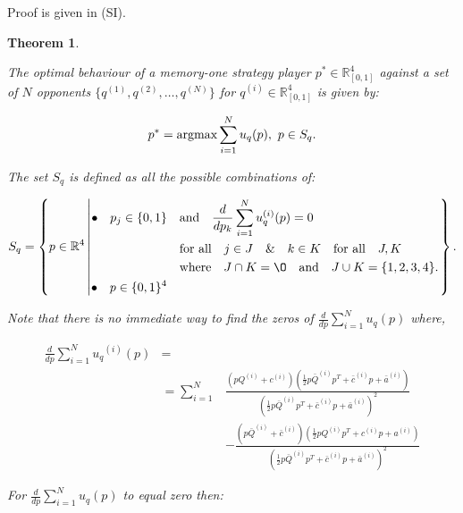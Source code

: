 \documentclass[9pt,twocolumn,twoside,lineno]{pnas-new}
\newcommand{\R}{\mathbb{R}}
\newtheorem{theorem}{Theorem}
\begin{document}
Proof is given in (SI).

\begin{theorem}\label{memone_group_best_response}

The optimal behaviour of a memory-one strategy player
\(p^* \in \R_{[0, 1]} ^ 4\)
against a set of \(N\) opponents \(\{q^{(1)}, q^{(2)}, \dots, q^{(N)} \}\)
for \(q^{(i)} \in \R_{[0, 1]} ^ 4\) is given by:

\[p^* = \textnormal{argmax}\sum\limits_{i=1} ^ N  u_q(p), \ p \in S_q.\]

The set \(S_q\) is defined as all the possible combinations of:

{\tiny
\begin{equation}\label{eq:s_q_set}
    S_q =
    \left\{p \in \mathbb{R} ^ 4 \left|
        \begin{aligned}
            \bullet\quad p_j \in \{0, 1\} & \quad \text{and} \quad \frac{d}{dp_k} 
            \sum\limits_{i=1} ^ N  u_q^{(i)}(p) = 0 \\
            & \quad \text{for all} \quad j \in J \quad \&  \quad k \in K  \quad \text{for all} \quad J, K \\
            & \quad \text{where} \quad J \cap K = \O \quad
            \text{and} \quad J \cup K = \{1, 2, 3, 4\}.\\
            \bullet\quad  p \in \{0, 1\} ^ 4
        \end{aligned}\right.
    \right\}.
\end{equation}
}

Note that there is no immediate way to find the zeros of
\(\frac{d}{dp} \sum\limits_{i=1} ^ N  u_q(p)\) where,

{\tiny
\begin{align}\label{eq:mo_tournament_derivative}
    \frac{d}{dp} \sum\limits_{i=1} ^ {N} {u_q}^{(i)} (p) & = \nonumber \\
    & = \displaystyle\sum\limits_{i=1} ^ {N} & 
    \frac{\left(pQ^{(i)} + c^{(i)}\right) \left(\frac{1}{2} p\bar{Q}^{(i)} p^T + \bar{c}^{(i)} p + \bar{a}^ {(i)}\right)}
    {\left(\frac{1}{2} p\bar{Q}^{(i)} p^T + \bar{c}^{(i)} p + \bar{a}^ {(i)}\right)^ 2} \nonumber \\ 
     & & - \frac{\left(p\bar{Q}^{(i)} + \bar{c}^{(i)}\right) \left(\frac{1}{2} pQ^{(i)} p^T + c^{(i)} p + a^ {(i)}\right)}
    {\left(\frac{1}{2} p\bar{Q}^{(i)} p^T + \bar{c}^{(i)} p + \bar{a}^ {(i)}\right)^ 2}
\end{align}
}

For \(\frac{d}{dp} \sum\limits_{i=1} ^ N  u_q(p)\) to equal zero then:


\end{theorem}
\end{document}
